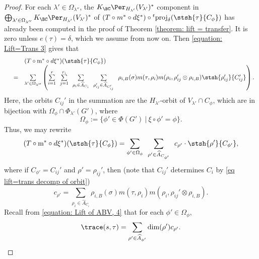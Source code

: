 \documentclass[11pt,letterpaper]{amsart}
\newcommand{\calm}{\textrm{m}}
\numberwithin{equation}{section}
\begin{document}
\begin{proof}
For each $\lambda' \in \Omega_{\lambda''}$, the $K_{\BC} \Per_{H_{\lambda'}}(V_{\lambda'})^{\ast}$ component in $    \bigoplus_{\lambda' \in \Omega_{\lambda''}} K_{\BC} \Per_{H_{\lambda'}}(V_{\lambda'})^{\ast}$ of  $(T \circ m^{\ast} \circ d\xi^{\ast})  \circ {}^t\textrm{proj}_{\delta} (\stsh{\tau}{C_{\phi}})$ has already been computed in the proof of Theorem \ref{theorem: lift = transfer}. It is zero unless $e(\tau)=\delta$, which we assume from now on. Then \eqref{equation: Lift=Trans 3} gives that 
    \[
    \begin{array}{rcl}
    && (T \circ  \calm^{\ast} \circ d\xi^{\ast}) ( \stsh{\tau}{C_{\phi}} )  \\
    & = &  
\mathop{\sum}\limits_{\lambda' \in \Omega_{\lambda''}} \left(\mathop{\sum}\limits_{ i=1 }^r 
    \hskip5pt \mathop{\sum}\limits_{ j=1 }^{r_i} 
    \hskip5pt 
\mathop{\sum}\limits_{\rho_i \in \widehat{A}_{C_i}} 
    \hskip5pt
\mathop{\sum}\limits_{\rho_{ij}' \in \widehat{A}_{C_{ij}'}}  
    \hskip5pt
   \rho_{i,B}({\sigma}) m(\tau, \rho_i) m(\rho_i, \rho_{ij}' \otimes \rho_{i,B}) \stsh{\rho_{ij}'}{C_{ij}'}\right).
   \end{array}
   \]
Here, the orbits $C_{ij}'$ in the summation are the $H_{\lambda'}$-orbit of $V_{\lambda'} \cap C_{\phi}$, which are in bijection with $\Omega_{\phi} \cap \Phi_{\lambda'}(G')$, where
\[\Omega_{\phi}:= \{ \phi' \in \Phi(G')\ | \ \xi \circ \phi'= \phi  \}. \]
Thus, we may rewrite 
\[(T \circ  \calm^{\ast} \circ d\xi^{\ast}) ( \stsh{\tau}{C_{\phi}} )
    =  
    \sum_{\phi' \in \Omega_{\phi} } 
    \hskip5pt 
     \sum_{\rho' \in \widehat{A}_{C_{\phi'}}}  
    \hskip5pt
   c_{\rho' }  \cdot \stsh{\rho'}{C_{\phi'}},\]
   where if $C_{\phi'}= C_{ij}'$ and $\rho'=\rho_{ij}'$, then (note that $C_{ij}'$ determines $C_i$ by \eqref{eq lift=trans decomp of orbit}) 
   \[ c_{\rho' }=\sum_{\rho_i \in \widehat{A}_{C_i}}  
   \rho_{i,B}({\sigma}) m(\tau, \rho_i) m(\rho_i, \rho_{ij}' \otimes \rho_{i,B}). \]
   Recall from \eqref{equation: Lift of ABV, 4} that for each $\phi' \in \Omega_{\phi},$
   \begin{align}\label{eq trans=lift disconnected 2}
       \trace(s,\tau)= \sum_{\rho' \in \widehat{A}_{\phi'}} \dim(\rho') c_{\rho'}.
   \end{align}


\end{proof}
\end{document}
